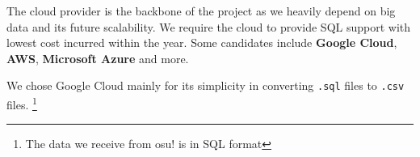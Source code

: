 The cloud provider is the backbone of the project as we heavily depend on big data and its future scalability.
We require the cloud to provide SQL support with lowest cost incurred within the year.
Some candidates include \textbf{Google Cloud}, \textbf{AWS}, \textbf{Microsoft Azure} and more.

We chose Google Cloud mainly for its simplicity in converting \verb+.sql+ files to \verb+.csv+ files. \footnote{The data we receive from osu! is in SQL format}
